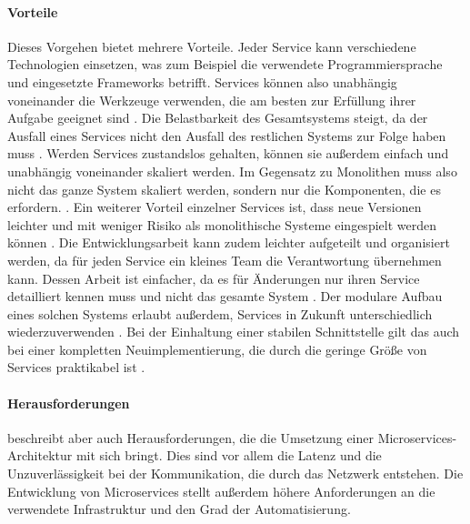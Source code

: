         \paragraph*{Vorteile}
        Dieses Vorgehen bietet mehrere Vorteile.
        Jeder Service kann verschiedene Technologien einsetzen,
        was zum Beispiel die verwendete Programmiersprache und eingesetzte Frameworks betrifft.
        Services können also unabhängig voneinander die Werkzeuge verwenden,
        die am besten zur Erfüllung ihrer Aufgabe geeignet sind
        \cite[Kapitel 1.2.1]{newman:microservices}.
        Die Belastbarkeit des Gesamtsystems steigt,
        da der Ausfall eines Services nicht den Ausfall des restlichen Systems
        zur Folge haben muss
        \cite[Kapitel 1.2.2]{newman:microservices}.
        Werden Services zustandslos gehalten,
        können sie außerdem einfach und unabhängig voneinander skaliert werden.
        Im Gegensatz zu Monolithen muss also nicht das ganze System skaliert werden,
        sondern nur die Komponenten, die es erfordern.
        \cite[Kapitel 1.2.3]{newman:microservices}.
        Ein weiterer Vorteil einzelner Services ist,
        dass neue Versionen leichter und mit weniger Risiko als monolithische Systeme
        eingespielt werden können
        \cite[Kapitel 1.2.4]{newman:microservices}.
        Die Entwicklungsarbeit kann zudem leichter aufgeteilt und organisiert werden,
        da für jeden Service ein kleines Team die Verantwortung übernehmen kann.
        Dessen Arbeit ist einfacher, da es für Änderungen nur ihren Service detailliert kennen muss
        und nicht das gesamte System
        \cite[Kapitel 1.2.5]{newman:microservices}.
        Der modulare Aufbau eines solchen Systems erlaubt außerdem, Services
        in Zukunft unterschiedlich wiederzuverwenden
        \cite[Kapitel 1.2.6]{newman:microservices}.
        Bei der Einhaltung einer stabilen Schnittstelle gilt das auch bei einer
        kompletten Neuimplementierung, die durch die geringe Größe von
        Services praktikabel ist
        \cite[Kapitel 1.2.7]{newman:microservices}.       

        \paragraph*{Herausforderungen}
        \citet[Kapitel 6.1-6.3]{wolff:microservices} beschreibt aber auch
        Herausforderungen, die die Umsetzung einer Microservices-Architektur mit sich bringt.
        Dies sind vor allem die Latenz und die Unzuverlässigkeit bei der Kommunikation,
        die durch das Netzwerk entstehen.
        Die Entwicklung von Microservices stellt außerdem höhere Anforderungen an die
        verwendete Infrastruktur und den Grad der Automatisierung.

